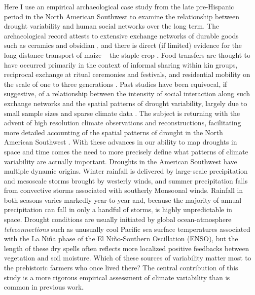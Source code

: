 \documentclass[10pt]{iopart}
\begin{document}
Here I use an empirical archaeological case study from the late pre-Hispanic period in the North American Southwest to examine the relationship between drought variability and human social networks over the long term. The archaeological record attests to extensive exchange networks of durable goods such as ceramics and obsidian \parencite{Mills2013a}, and there is direct (if limited) evidence for the long-distance transport of maize -- the staple crop \parencite{Benson2010, Benson2010WhoDrought}. Food transfers are thought to have occurred primarily in the context of informal sharing within kin groups, reciprocal exchange at ritual ceremonies and festivals, and residential mobility on the scale of one to three generations \parencite{Hegmon1991,Hegmon1996,Varien1999SedentismBeyond,Cordell2007MesaMigration}. Past studies have been equivocal, if suggestive, of a relationship between the intensity of social interaction along such exchange networks and the spatial patterns of drought variability, largely due to small sample sizes and sparse climate data \parencite{Rautman1993a,Johnson1990ChumashAnalysis}. The subject is returning with the advent of high resolution climate observations and reconstructions, facilitating more detailed accounting of the spatial patterns of drought in the North American Southwest \parencite{Strawhacker2017RiskProvince}. With these advances in our ability to map droughts in space and time comes the need to more precisely define what patterns of climate variability are actually important. Droughts in the American Southwest have multiple dynamic origins. Winter rainfall is delivered by large-scale precipitation and mesoscale storms brought by westerly winds, and summer precipitation falls from convective storms associated with southerly Monsoonal winds. Rainfall in both seasons varies markedly year-to-year and, because the majority of annual precipitation can fall in only a handful of storms, is highly unpredictable in space. Drought conditions are usually initiated by global ocean-atmosphere \textit{teleconnections} such as unusually cool Pacific sea surface temperatures associated with the La Ni\~{n}a phase of the El Ni\~{n}o-Southern Oscillation (ENSO), but the length of these dry spells often reflects more localized positive feedbacks between vegetation and soil moisture. Which of these sources of variability matter most to the prehistoric farmers who once lived there? The central contribution of this study is a more rigorous empirical assessment of climate variability than is common in previous work.
\end{document}
